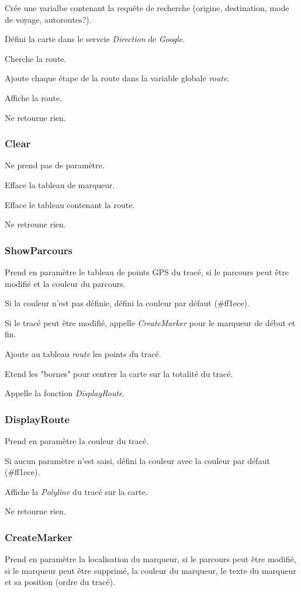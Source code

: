 \documentclass[a4paper]{article}
\begin{document}
Crée une varialbe contenant la requête de recherche (origine, destination, mode de voyage, autoroutes?).

Défini la carte dans le servcie \emph{Direction} de \emph{Google}.

Cherche la route.

Ajoute chaque étape de la route dans la variable globale \emph{route}.

Affiche la route.

Ne retourne rien.

\subsubsection{Clear}
Ne prend pas de paramètre.

Efface la tableau de marqueur.

Efface le tableau contenant la route.

Ne retroune rien.

\subsubsection{ShowParcours}
Prend en paramètre le tableau de points GPS du tracé, si le parcours peut être modifié et la couleur du parcours.

Si la couleur n'est pas définie, défini la couleur par défaut (\#ff1ece).

Si le tracé peut être modifié, appelle \emph{CreateMarker} pour le marqueur de début et fin.

Ajoute au tableau \emph{route} les points du tracé.

Etend les "bornes" pour centrer la carte sur la totalité du tracé.

Appelle la fonction \emph{DisplayRoute}.

\subsubsection{DisplayRoute}
Prend en paramètre la couleur du tracé.

Si aucun paramètre n'est saisi, défini la couleur avec la couleur par défaut (\#ff1ece).

Affiche la \emph{Polyline} du tracé sur la carte.

Ne retourne rien.

\subsubsection{CreateMarker}
Prend en paramètre la localisation du marqueur, si le parcours peut être modifié, si le marqueur peut être supprimé, la couleur du marqueur, le texte du marqueur et sa position (ordre du tracé).
\end{document}
